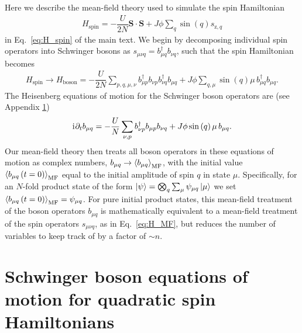 \documentclass[nofootinbib,twocolumn]{revtex4-2}
\renewcommand{\t}{\text} %
\newcommand{\f}[2]{\dfrac{#1}{#2}} %
\newcommand{\p}[1]{\left(#1\right)} %
\newcommand{\bk}{\Braket} %
\renewcommand{\v}{\bm} %
\renewcommand{\c}{\cdot} %
\renewcommand{\i}{\mathrm{i}\mkern1mu} %
\newcommand{\1}{\mathds{1}}
\newcommand{\z}{\text{z}}
\newcommand{\spin}{\text{spin}}
\newcommand{\MF}{\text{MF}}
\begin{document}
Here we describe the mean-field theory used to simulate the spin Hamiltonian
\begin{align}
  H_\spin = -\f{U}{2N}\v S\c\v S + J\phi \sum_q \sin\p{q} s_{\z,q}
\end{align}
in Eq.~\eqref{eq:H_spin} of the main text.
We begin by decomposing individual spin operators into Schwinger bosons as $s_{\mu\nu q} = b_{\mu q}^\dag b_{\nu q}$, such that the spin Hamiltonian becomes
\begin{align}
  H_\spin \to H_{\t{boson}}
  = -\f{U}{2N} \sum_{p,q,\mu,\nu}
  b_{\mu p}^\dag b_{\nu p} b_{\nu q}^\dag b_{\mu q}
  + J\phi \sum_{q,\mu} \sin\p{q} \mu\, b_{\mu q}^\dag b_{\mu q}.
\end{align}
The Heisenberg equations of motion for the Schwinger boson operators are (see Appendix \ref{sec:bosons})
\begin{align}
  \i \partial_t b_{\mu q}
  = -\f{U}{N} \sum_{\nu,p} b_{\nu p}^\dag b_{\mu p} b_{\nu q}
  + J\phi \sin\p{q} \mu\, b_{\mu q}.
\end{align}
Our mean-field theory then treats all boson operators in these equations of motion as complex numbers, $b_{\mu q}\to\bk{b_{\mu q}}_\MF$, with the initial value $\bk{b_{\mu q}\p{t=0}}_\MF$ equal to the initial amplitude of spin $q$ in state $\mu$.
Specifically, for an $N$-fold product state of the form $\ket\psi=\bigotimes_q\sum_\mu\psi_{\mu q}\ket{\mu}$ we set $\bk{b_{\mu q}\p{t=0}}_\MF = \psi_{\mu q}$.
For pure initial product states, this mean-field treatment of the boson operators $b_{\mu q}$ is mathematically equivalent to a mean-field treatment of the spin operators $s_{\mu\nu q}$, as in Eq.~\eqref{eq:H_MF}, but reduces the number of variables to keep track of by a factor of $\sim n$.

\section{Schwinger boson equations of motion for quadratic spin Hamiltonians}
\label{sec:bosons}
\end{document}
